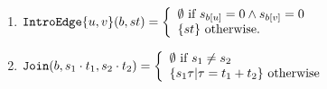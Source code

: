 \begin{definition}
\begin{enumerate}
\item \label{VCDP-coreIntroEdge}$\texttt{IntroEdge}\{u,v\}(b,st) \\= \left\{\begin{array}{l}
\emptyset \mbox{ if $ s_{b[u]} = 0 \land s_{b[v]} = 0 $} \\ 
\{st\} \mbox{ otherwise.} 
\end{array}\right. $

\item \label{VCDP-coreJoin}$\texttt{Join}(b, s_1\cdot t_1,s_2\cdot t_2) \\= \left\{
\begin{array}{l}
\emptyset \mbox{ if $s_1\neq s_2$} \\ 
\{s_1\tau | \tau = t_1 + t_2\} \mbox{ otherwise} 
\end{array}\right.$

\end{enumerate}

    
\end{definition}



